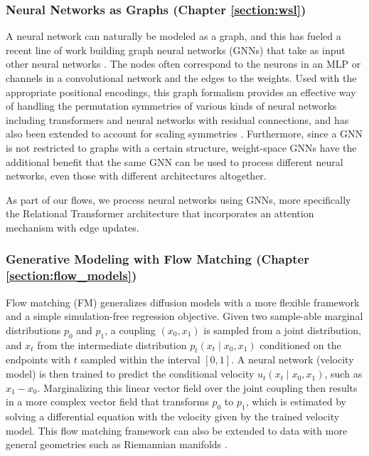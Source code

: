 \subsubsection{Neural Networks as Graphs (Chapter \ref{section:wsl})}

A neural network can naturally be modeled as a graph, and this has fueled a recent line of work building graph neural networks (GNNs) that take as input other neural networks \citep{kofinasGraphNeuralNetworks2024,limGraphMetanetworksProcessing2023,kalogeropoulosScaleEquivariantGraph2024}. The nodes often correspond to the neurons in an MLP or channels in a convolutional network and the edges to the weights. Used with the appropriate positional encodings, this graph formalism provides an effective way of handling the permutation symmetries of various kinds of neural networks including transformers and neural networks with residual connections, and has also been extended to account for scaling symmetries \citep{kalogeropoulosScaleEquivariantGraph2024}. Furthermore, since a GNN is not restricted to graphs with a certain structure, weight-space GNNs have the additional benefit that the same GNN can be used to process different neural networks, even those with different architectures altogether.

As part of our flows, we process neural networks using GNNs, more specifically the Relational Transformer architecture \citep{diaoRelationalAttentionGeneralizing2023,kofinasGraphNeuralNetworks2024} that incorporates an attention mechanism with edge updates. 

\subsubsection{Generative Modeling with Flow Matching (Chapter \ref{section:flow_models})}

Flow matching (FM) \citep{lipmanFlowMatchingGenerative2023,albergoStochasticInterpolantsUnifying2023,liuFlowStraightFast2022,tongImprovingGeneralizingFlowbased2023} generalizes diffusion models with a more flexible framework and a simple simulation-free regression objective. Given two sample-able marginal distributions $p_0$ and $p_1$, a coupling $(x_0, x_1)$ is sampled from a joint distribution, and $x_t$ from the intermediate distribution $p_t(x_t \mid x_0, x_1)$ conditioned on the endpoints with $t$ sampled within the interval $[0,1]$. A neural network (velocity model) is then trained to predict the conditional velocity $u_t(x_t \mid x_0, x_1)$, such as $x_1 - x_0$. Marginalizing this linear vector field over the joint coupling then results in a more complex vector field that transforms $p_0$ to $p_1$, which is estimated by solving a differential equation with the velocity given by the trained velocity model. This flow matching framework can also be extended to data with more general geometries such as Riemannian manifolds \citep{chenRiemannianFlowMatching2023}. 

